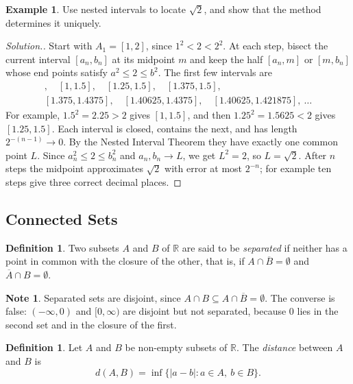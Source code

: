 \documentclass[11pt,a4paper]{article}
\numberwithin{equation}{section}
\theoremstyle{definition}
\newtheorem{defn}[thm]{Definition}
\newtheorem{exa}[thm]{Example}
\newtheorem*{note}{Note}
\newenvironment{solution}
  {\renewcommand{\qedsymbol}{}\begin{proof}[\textit{Solution}.]}
  {\end{proof}}
\begin{document}
\begin{exa}
Use nested intervals to locate $\sqrt{2}$, and show that the method determines it uniquely.
\end{exa}

\begin{solution}
Start with $A_1 = [1,2]$, since $1^2<2<2^2$. At each step, bisect the current interval $[a_n,b_n]$ at its midpoint $m$ and keep the half $[a_n,m]$ or $[m,b_n]$ whose end points satisfy $a^2\leq 2\leq b^2$. The first few intervals are
\begin{gather*}
[1,2],\quad [1,1.5],\quad [1.25,1.5],\quad [1.375,1.5],\\
[1.375,1.4375],\quad [1.40625,1.4375],\quad [1.40625,1.421875],\ \dots
\end{gather*}
For example, $1.5^2 = 2.25>2$ gives $[1,1.5]$, and then $1.25^2 = 1.5625<2$ gives $[1.25,1.5]$. Each interval is closed, contains the next, and has length $2^{-(n-1)}\longrightarrow 0$. By the Nested Interval Theorem they have exactly one common point $L$. Since $a_n^2\leq 2\leq b_n^2$ and $a_n, b_n\longrightarrow L$, we get $L^2 = 2$, so $L = \sqrt{2}$. After $n$ steps the midpoint approximates $\sqrt{2}$ with error at most $2^{-n}$; for example ten steps give three correct decimal places.
\end{solution}


\subsection{Connected Sets}

\begin{defn}
Two subsets $A$ and $B$ of $\mathbb{R}$ are said to be \emph{separated} if neither has a point in common with the closure of the other, that is, if $A\cap \overline{B} = \emptyset$ and $\overline{A} \cap B = \emptyset$.
\end{defn}

\begin{note}
Separated sets are disjoint, since $A \cap B \subseteq A \cap \overline{B} = \emptyset$. The converse is false: $(-\infty,0)$ and $[0,\infty)$ are disjoint but not separated, because $0$ lies in the second set and in the closure of the first.
\end{note}


\begin{defn}
Let $A$ and $B$ be non-empty subsets of $\mathbb{R}$. The \emph{distance} between $A$ and $B$ is
$$d(A,B) = \inf\{| a - b| : a\in A,\ b\in B\}.$$
\end{defn}
\end{document}
